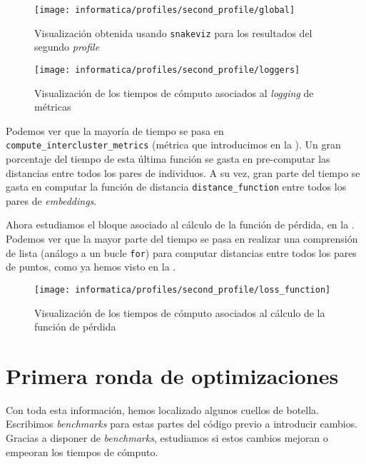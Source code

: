 \begin{figure}[!hbtp]
	\centering
	\texttt{[image: informatica/profiles/second\_profile/global]}
	\caption{Visualización obtenida usando \lstinline{snakeviz} para los resultados del segundo \textit{profile}}
	\label{img:optimizacion_02}
\end{figure}

\begin{figure}[!hbtp]
	\centering
	\texttt{[image: informatica/profiles/second\_profile/loggers]}
	\caption{Visualización de los tiempos de cómputo asociados al \textit{logging} de métricas}
	\label{img:second_profile_tiempos_metricas}
\end{figure}

Podemos ver que la mayoría de tiempo se pasa en \lstinline{compute_intercluster_metrics} (métrica que introducimos en la ). Un gran porcentaje del tiempo de esta última función se gasta en pre-computar las distancias entre todos los pares de individuos. A su vez, gran parte del tiempo se gasta en computar la función de distancia \lstinline{distance_function} entre todos los pares de \textit{embeddings}.

Ahora estudiamos el bloque asociado al cálculo de la función de pérdida, en la . Podemos ver que la mayor parte del tiempo se pasa en realizar una comprensión de lista (análogo a un bucle \lstinline{for}) para computar distancias entre todos los pares de puntos, como ya hemos visto en la .

\begin{figure}[!hbtp]
	\centering
	\texttt{[image: informatica/profiles/second\_profile/loss\_function]}
	\caption{Visualización de los tiempos de cómputo asociados al cálculo de la función de pérdida}
	\label{img:optimizacion_03}
\end{figure}

\section{Primera ronda de optimizaciones}

Con toda esta información, hemos localizado algunos cuellos de botella. Escribimos \textit{benchmarks} para estas partes del código previo a introducir cambios. Gracias a disponer de \textit{benchmarks}, estudiamos si estos cambios mejoran o empeoran los tiempos de cómputo.

